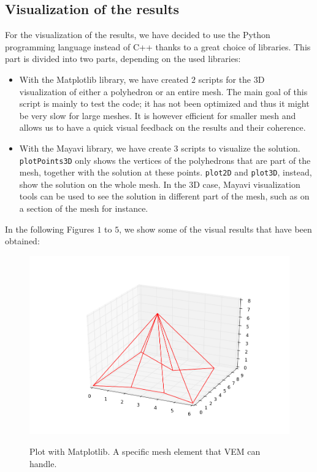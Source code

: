 \subsection{Visualization of the results}
For the visualization of the results, we have decided to use the Python programming language instead of C++ thanks to a great choice of libraries. This part is divided into two parts, depending on the used libraries:
\begin{itemize}
\item With {\color{red} the} Matplotlib library, we have created $2$ scripts for the $3$D visualization of either a polyhedron or an entire mesh. The main goal of this script is mainly to test the code; it has not been optimized and thus it might be very slow for large meshes. It is however efficient for smaller mesh and allows us to have a quick visual feedback on the results and their coherence. 
\item With {\color{red} the} Mayavi library, we have create $3$ scripts to visualize the solution. \verb|plotPoints3D| only shows the vertices of the polyhedrons that are part of the mesh, together with the solution at these points. \verb|plot2D| and \verb|plot3D|, instead, show the solution on the whole mesh. In the $3$D case, Mayavi visualization tools can be used to see the solution in different part of the mesh, such as on a section of the mesh for instance. 
\end{itemize}

In the following Figures $1$ to $5$, we show some of the visual results that have been obtained:

\begin{figure}[!h]
\label{img:matplotlibPolyhedron}
\centering
\includegraphics[scale=0.4]{images/matplotlibTest5.png}\label{geom}
\caption{Plot with Matplotlib. A specific mesh element that VEM can handle.}
\end{figure}

